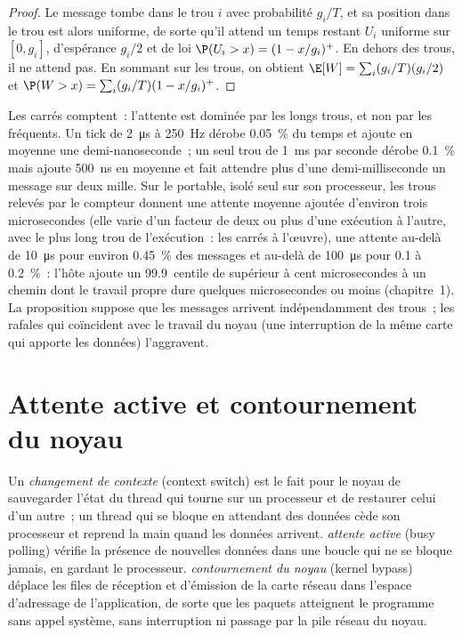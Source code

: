 \begin{proof}
Le message tombe dans le trou $i$ avec probabilité $g_i/T$, et sa position dans le trou est alors uniforme, de sorte qu'il attend un
temps restant $U_i$ uniforme sur $[0, g_i]$, d'espérance $g_i/2$ et de loi $\P(U_i > x) = (1 - x/g_i)^+$. En dehors des trous, il ne
attend pas. En sommant sur les trous, on obtient $\E[W] = \sum_i (g_i/T)(g_i/2)$ et $\P(W > x) = \sum_i (g_i/T)(1 - x/g_i)^+$.
\end{proof}

Les carrés comptent~: l'attente est dominée par les longs trous, et non par les fréquents. Un tick de \qty{2}{\micro\second} à
250~Hz dérobe 0.05~\% du temps et ajoute en moyenne une demi-nanoseconde~; un seul trou de \qty{1}{\milli\second} par seconde dérobe
0.1~\% mais ajoute \qty{500}{\nano\second} en moyenne et fait attendre plus d'une demi-milliseconde un message sur deux mille.
Sur le portable, isolé seul sur son processeur, les trous relevés par le compteur donnent une attente moyenne ajoutée d'environ trois microsecondes (elle varie d'un facteur
de deux ou plus d'une exécution à l'autre, avec le plus long trou de l'exécution~: les carrés à l'œuvre), une attente au-delà de \qty{10}{\micro\second}
pour environ 0.45~\% des messages et au-delà de \qty{100}{\micro\second} pour 0.1 à 0.2~\%~: l'hôte ajoute un 99.9~centile de
supérieur à cent microsecondes à un chemin dont le travail propre dure quelques microsecondes ou moins (chapitre~1). La proposition suppose que les messages arrivent
indépendamment des trous~; les rafales qui coïncident avec le travail du noyau (une interruption de la même carte qui apporte les
données) l'aggravent.

\section{Attente active et contournement du noyau}

\begin{definition}\label{def:ll:linux-tuning:polling}
Un \emph{changement de contexte} (context switch) est le fait pour le noyau de sauvegarder l'état du thread qui tourne sur un processeur et de restaurer
celui d'un autre~; un thread qui se bloque en attendant des données cède son processeur et reprend la main quand les données arrivent. \emph{attente
active} (busy polling) vérifie la présence de nouvelles données dans une boucle qui ne se bloque jamais, en gardant le processeur. \emph{contournement
du noyau} (kernel bypass) déplace les files de réception et d'émission de la carte réseau dans l'espace d'adressage de l'application, de sorte que
les paquets atteignent le programme sans appel système, sans interruption ni passage par la pile réseau du noyau.
\end{definition}

